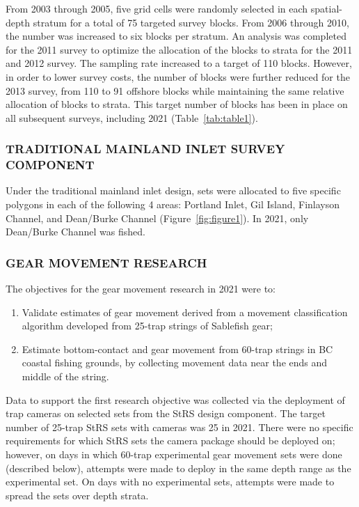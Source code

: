 \documentclass[12pt]{article}\usepackage[]{graphicx}\usepackage[]{color}
\begin{document}
From 2003 through 2005, five grid cells were randomly selected in each spatial-depth stratum for a total of 75 targeted survey blocks. From 2006 through 2010, the number was increased to six blocks per stratum. An analysis was completed for the 2011 survey to optimize the allocation of the blocks to strata for the 2011 and 2012 survey. The sampling rate increased to a target of 110 blocks. However, in order to lower survey costs, the number of blocks were further reduced for the 2013 survey, from 110 to 91 offshore blocks while maintaining the same relative allocation of blocks to strata. This target number of blocks has been in place on all subsequent surveys, including 2021 (Table~\ref{tab:table1}).

\hypertarget{traditional-mainland-inlet-survey-component}{%
\subsubsection{TRADITIONAL MAINLAND INLET SURVEY COMPONENT}\label{traditional-mainland-inlet-survey-component}}

Under the traditional mainland inlet design, sets were allocated to five specific polygons in each of the following 4 areas: Portland Inlet, Gil Island, Finlayson Channel, and Dean/Burke Channel (Figure~\ref{fig:figure1}). In 2021, only Dean/Burke Channel was fished.

\hypertarget{gear-movement-research}{%
\subsubsection{GEAR MOVEMENT RESEARCH}\label{gear-movement-research}}

The objectives for the gear movement research in 2021 were to:
\begin{enumerate}
\def\labelenumi{\arabic{enumi}.}

\item
  Validate estimates of gear movement derived from a movement classification algorithm developed from 25-trap strings of Sablefish gear;
\item
  Estimate bottom-contact and gear movement from 60-trap strings in BC coastal fishing grounds, by collecting movement data near the ends and middle of the string.
\end{enumerate}
Data to support the first research objective was collected via the deployment of trap cameras on selected sets from the StRS design component. The target number of 25-trap StRS sets with cameras was 25 in 2021. There were no specific requirements for which StRS sets the camera package should be deployed on; however, on days in which 60-trap experimental gear movement sets were done (described below), attempts were made to deploy in the same depth range as the experimental set. On days with no experimental sets, attempts were made to spread the sets over depth strata.
\end{document}
